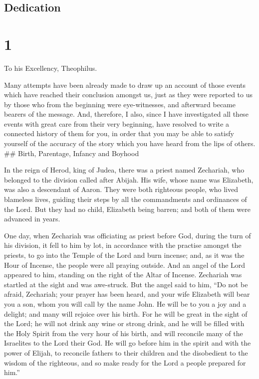 \hypertarget{dedication}{%
\subsection{Dedication}\label{dedication}}

\hypertarget{section}{%
\section{1}\label{section}}

 To his Excellency, Theophilus.

Many attempts have been already made to draw up an account of those
events which have reached their conclusion amongst us,  just
as they were reported to us by those who from the beginning were
eye-witnesses, and afterward became bearers of the message. 
And, therefore, I also, since I have investigated all these events with
great care from their very beginning, have resolved to write a connected
history of them for you,  in order that you may be able to
satisfy yourself of the accuracy of the story which you have heard from
the lips of others. \#\# Birth, Parentage, Infancy and Boyhood

 In the reign of Herod, king of Judea, there was a priest
named Zechariah, who belonged to the division called after Abijah. His
wife, whose name was Elizabeth, was also a descendant of Aaron.
 They were both righteous people, who lived blameless lives,
guiding their steps by all the commandments and ordinances of the Lord.
 But they had no child, Elizabeth being barren; and both of
them were advanced in years.

 One day, when Zechariah was officiating as priest before
God, during the turn of his division,  it fell to him by
lot, in accordance with the practise amongst the priests, to go into the
Temple of the Lord and burn incense;  and, as it was the
Hour of Incense, the people were all praying outside.  And
an angel of the Lord appeared to him, standing on the right of the Altar
of Incense.  Zechariah was startled at the sight and was
awe-struck.  But the angel said to him, ``Do not be afraid,
Zechariah; your prayer has been heard, and your wife Elizabeth will bear
you a son, whom you will call by the name John.  He will be
to you a joy and a delight; and many will rejoice over his birth.
 For he will be great in the sight of the Lord; he will not
drink any wine or strong drink, and he will be filled with the Holy
Spirit from the very hour of his birth,  and will reconcile
many of the Israelites to the Lord their God.  He will go
before him in the spirit and with the power of Elijah, to reconcile
fathers to their children and the disobedient to the wisdom of the
righteous, and so make ready for the Lord a people prepared for him.''

